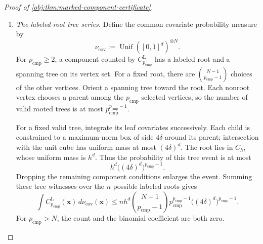 \documentclass[11pt]{article}
\begin{document}
\begin{proof}[Proof of \cref{obj:thm:marked-component-certificate}]
\begin{enumerate}
Set
\[
c_I:=\min\{c_H,c_U\}.
\]
Its amplitude conditions permit both the component bound and the uninformative-component equalities. A component containing a labeled record and having size less than two has size one, so its distance is zero by singleton cancellation. A component containing no labeled record is auxiliary-only, so its distance is also zero. Define the informative component counts, for every integer \(p_{\mathrm{cmp}}\ge0\), by
\[
C_{p_{\mathrm{cmp}}}^{\mathrm L}(\mathbf x)
:=
\#\left\{
\mathcal V\in\mathscr K_{\mathbf x}:
|\mathcal V|=p_{\mathrm{cmp}},\
\mathcal V\cap\{1,\ldots,n\}\ne\varnothing
\right\}.
\]
Regrouping the remaining component sum by size gives
\[
\int(\sqrt{g_{+1}}-\sqrt{g_{-1}})^2\,d\mu_{\mathrm{spin}}
\le
K_{\mathrm{info}}a^2b^2
\sum_{p_{\mathrm{cmp}}=2}^{N}
(9/2)^{p_{\mathrm{cmp}}}
p_{\mathrm{cmp}}^4C_{p_{\mathrm{cmp}}}^{\mathrm L}(\mathbf x).
\]
The graph \(\mathscr G_{\mathbf x}\) is exactly the graph in the statement: it retains all \(N\) vertices, including the exterior singleton components, whose density factors equal one.

\item \textit{The labeled-root tree series.}
Define the common covariate probability measure by
\[
\nu_{\mathrm{cov}}
:=
\operatorname{Unif}([0,1]^d)^{\otimes N}.
\]
For \(p_{\mathrm{cmp}}\ge2\), a component counted by
\(C_{p_{\mathrm{cmp}}}^{\mathrm L}\) has a labeled root and a spanning tree on its vertex set. For a fixed root, there are
\(\binom{N-1}{p_{\mathrm{cmp}}-1}\) choices of the other vertices. Orient a spanning tree toward the root. Each nonroot vertex chooses a parent among the \(p_{\mathrm{cmp}}\) selected vertices, so the number of valid rooted trees is at most
\(p_{\mathrm{cmp}}^{p_{\mathrm{cmp}}-1}\).

For a fixed valid tree, integrate its leaf covariates successively. Each child is constrained to a maximum-norm box of side \(4\delta\) around its parent; intersection with the unit cube has uniform mass at most \((4\delta)^d\). The root lies in \(C_h\), whose uniform mass is \(h^d\). Thus the probability of this tree event is at most
\[
h^d\bigl((4\delta)^d\bigr)^{p_{\mathrm{cmp}}-1}.
\]
Dropping the remaining component conditions enlarges the event. Summing these tree witnesses over the \(n\) possible labeled roots gives
\[
\int C_{p_{\mathrm{cmp}}}^{\mathrm L}(\mathbf x)\,
d\nu_{\mathrm{cov}}(\mathbf x)
\le
nh^d
\binom{N-1}{p_{\mathrm{cmp}}-1}
p_{\mathrm{cmp}}^{p_{\mathrm{cmp}}-1}
\bigl((4\delta)^d\bigr)^{p_{\mathrm{cmp}}-1}.
\]
For \(p_{\mathrm{cmp}}>N\), the count and the binomial coefficient are both zero.


\end{enumerate}
\end{proof}
\end{document}
